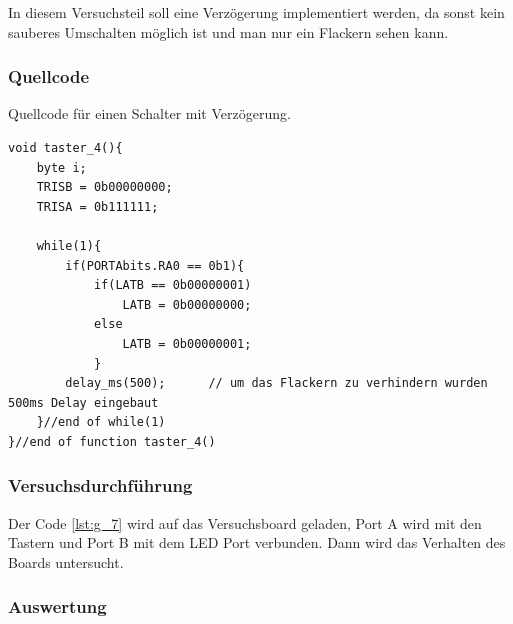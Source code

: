 \documentclass[12pt,a4paper]{article}
\begin{document}
In diesem Versuchsteil soll eine Verzögerung implementiert werden, da sonst kein sauberes Umschalten möglich ist und man nur ein Flackern sehen kann.

\subsubsection*{Quellcode}

Quellcode für einen Schalter mit Verzögerung.

\lstset{language=C, basicstyle=\tiny}
\begin{lstlisting}[caption = {Tastabfrage und Verzögerung}, label=lst:g_7,captionpos=b]
void taster_4(){
	byte i;
	TRISB = 0b00000000;
	TRISA = 0b111111;
	
	while(1){
		if(PORTAbits.RA0 == 0b1){
			if(LATB == 0b00000001)
				LATB = 0b00000000;
			else
				LATB = 0b00000001;
			}
		delay_ms(500);		// um das Flackern zu verhindern wurden 500ms Delay eingebaut
	}//end of while(1)
}//end of function taster_4()
\end{lstlisting}

\subsubsection*{Versuchsdurchführung}

Der Code \ref{lst:g_7} wird auf das Versuchsboard geladen, Port A wird mit den Tastern und Port B mit dem LED Port verbunden. Dann wird das Verhalten des Boards untersucht.

\subsubsection*{Auswertung}
\end{document}

